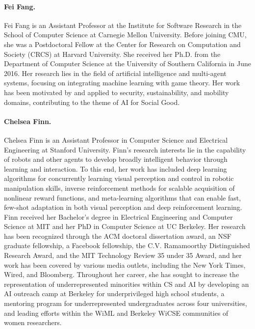 \paragraph{Fei Fang.} Fei Fang is an Assistant Professor at the Institute for Software Research in the School of Computer Science at Carnegie Mellon University. Before joining CMU, she was a Postdoctoral Fellow at the Center for Research on Computation and Society (CRCS) at Harvard University. She received her Ph.D. from the Department of Computer Science at the University of Southern California in June 2016.
Her research lies in the field of artificial intelligence and multi-agent systems, focusing on integrating machine learning with game theory. Her work has been motivated by and applied to security, sustainability, and mobility domains, contributing to the theme of AI for Social Good. 


\paragraph{Chelsea Finn.} Chelsea Finn is an Assistant Professor in Computer Science and Electrical Engineering at Stanford University. Finn's research interests lie in the capability of robots and other agents to develop broadly intelligent behavior through learning and interaction. To this end, her work has included deep learning algorithms for concurrently learning visual perception and control in robotic manipulation skills, inverse reinforcement methods for scalable acquisition of nonlinear reward functions, and meta-learning algorithms that can enable fast, few-shot adaptation in both visual perception and deep reinforcement learning. Finn received her Bachelor's degree in Electrical Engineering and Computer Science at MIT and her PhD in Computer Science at UC Berkeley. Her research has been recognized through the ACM doctoral dissertation award, an NSF graduate fellowship, a Facebook fellowship, the C.V. Ramamoorthy Distinguished Research Award, and the MIT Technology Review 35 under 35 Award, and her work has been covered by various media outlets, including the New York Times, Wired, and Bloomberg. Throughout her career, she has sought to increase the representation of underrepresented minorities within CS and AI by developing an AI outreach camp at Berkeley for underprivileged high school students, a mentoring program for underrepresented undergraduates across four universities, and leading efforts within the WiML and Berkeley WiCSE communities of women researchers.

